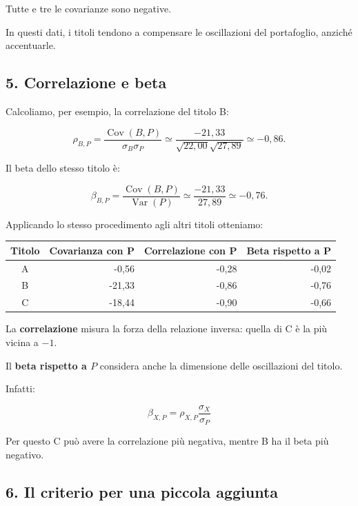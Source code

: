 \noindent Tutte e tre le covarianze
sono negative.

\noindent In questi dati,
i titoli tendono a compensare
le oscillazioni del portafoglio,
anziché accentuarle.


\subsection*{5. Correlazione e beta}

\noindent Calcoliamo, per esempio,
la correlazione del titolo B:

\[
\rho_{B,P}
=
\frac{\operatorname{Cov}(B,P)}
{\sigma_B\sigma_P}
\simeq
\frac{-21{,}33}
{\sqrt{22{,}00}\sqrt{27{,}89}}
\simeq
\boxed{-0{,}86}.
\]

\noindent Il beta dello stesso titolo è:

\[
\beta_{B,P}
=
\frac{\operatorname{Cov}(B,P)}
{\operatorname{Var}(P)}
\simeq
\frac{-21{,}33}{27{,}89}
\simeq
\boxed{-0{,}76}.
\]

\noindent Applicando lo stesso procedimento
agli altri titoli otteniamo:

\begin{center}
    \begin{tabular}{|c|r|r|r|}
        \hline
        \textbf{Titolo}
        & \textbf{Covarianza con P}
        & \textbf{Correlazione con P}
        & \textbf{Beta rispetto a P} \\
        \hline
        A & -0,56 & -0,28 & -0,02 \\
        B & -21,33 & -0,86 & -0,76 \\
        C & -18,44 & -0,90 & -0,66 \\
        \hline
    \end{tabular}
\end{center}

\noindent La \textbf{correlazione}
misura la forza della relazione inversa:
quella di C è la più vicina a $-1$.

\noindent Il \textbf{beta rispetto a $P$}
considera anche la dimensione
delle oscillazioni del titolo.

\noindent Infatti:

\[
\boxed{
\beta_{X,P}
=
\rho_{X,P}\frac{\sigma_X}{\sigma_P}
}
\]

\noindent Per questo C può avere
la correlazione più negativa,
mentre B ha il beta più negativo.


\subsection*{6. Il criterio per una piccola aggiunta}

